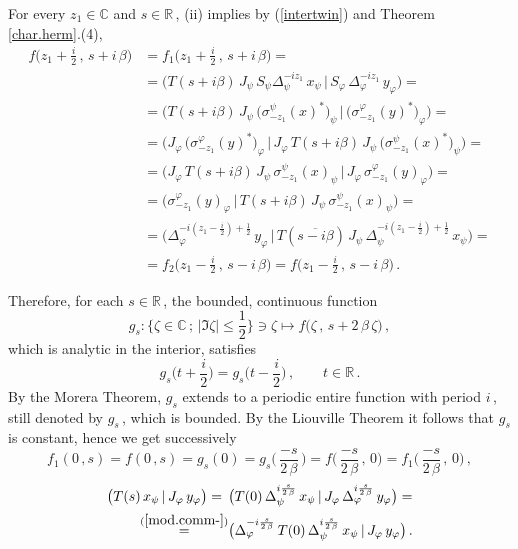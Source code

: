 \documentclass[reqno]{amsart}
\theoremstyle{definition}
\theoremstyle{remark}
\numberwithin{equation}{section}
\theoremstyle{plain}
\begin{document}
For every $z_1\in\mathbb C$ and $s\in\mathbb R\,$, (ii) implies
by (\ref{intertwin}) and Theorem \ref{char.herm}.(4),
\begin{align*}
f\Big( z_1+\frac i2\, ,\, s+i\,\beta \Big) &=f_1\Big( z_1+
\frac i2\, ,\, s+i\,\beta \Big) =\\
&=\big( T(s+i\beta )\, J_\psi\, S_\psi \Delta_\psi^{-i z_1}\,
x_\psi\, |\, S_\varphi\, \Delta_\varphi^{-i z_1}\, y_\varphi
\big) = \\
&=\big( T(s+i\beta )\, J_\psi\, \big(\sigma^\psi_{-z_1}
(x)^*\big)_\psi\, |\, \big(\sigma^\varphi_{-z_1}(y)^*
\big)_\varphi \big) =\\
&=\big( J_\varphi\, \big(\sigma^\varphi_{-z_1}(y)^*\big)_\varphi
\, |\, J_\varphi\, T(s+i\beta )\, J_\psi\, \big(
\sigma^\psi_{-z_1} (x)^*\big)_\psi \big) =\\
&=\big( J_\varphi\, T(s+i\beta )\, J_\psi\, \sigma^\psi_{-z_1}
(x)_\psi\, |\, J_\varphi\, \sigma^\varphi_{-z_1}(y)_\varphi
\big) =\\
&=\big( \sigma^\varphi_{-z_1}(y)_\varphi\, |\, T(s+i\beta )\,
J_\psi\, \sigma^\psi_{-z_1} (x)_\psi \big) =\\
&=\big( \Delta_\varphi^{-i (z_1-\frac i2 )+\frac 12}\, y_\varphi
\, |\, T(\overline{s-i \beta} )\, J_\psi\,
\Delta_\psi^{-i (z_1-\frac i2 )+\frac 12}\, x_\psi \big) =\\
&=f_2\Big( z_1-\frac i2\, ,\, s-i\,\beta \Big) =
f\Big( z_1-\frac i2\, ,\, s-i\,\beta \Big)\, .
\end{align*}

Therefore, for each $s\in\mathbb R\,$, the bounded, continuous
function
\begin{equation*}
g_s : \Big\{ \zeta\in\mathbb C\, ;\, |\Im \zeta |\leq\frac 12\Big\}
\ni\zeta\longmapsto f\big(\zeta\, ,\, s+2\,\beta\,\zeta\big)\, ,
\end{equation*}
which is analytic in the interior, satisfies
\begin{equation*}
g_s \Big( t+\frac i2\Big) =g_s \Big( t-\frac i2\Big)\, ,\qquad
t\in\mathbb R\, .
\end{equation*}
By the Morera Theorem, $g_s$ extends to a periodic entire function
with period $i\,$, still denoted by $g_s\,$, which is bounded. By
the Liouville Theorem it follows that $g_s$ is constant, hence we
get successively
\begin{equation*}
f_1(0\, ,s)=f(0\, ,s)=g_s(0)=g_s\Big(\,\frac {-s}{2\,\beta}\,\Big)
=f\Big(\,\frac {-s}{2\,\beta}\, ,\, 0\Big) =
f_1\Big(\,\frac {-s}{2\,\beta}\, ,\, 0\Big)\, ,
\end{equation*}
\begin{align*}
\big( T(s)\, x_\psi\, |\, J_\varphi\, y_\varphi\big) =\;\,& \big( T(0)
\,\Delta_\psi^{i \frac s{2\,\beta}}\, x_\psi\, |\, J_\varphi\,
\Delta_\varphi^{i \frac s{2\,\beta}}\, y_\varphi \big) =\\
\overset{(\ref{mod.comm-})}{=}&
\big( \Delta_\varphi^{-i \frac s{2\,\beta}}\, T(0)\,
\Delta_\psi^{i \frac s{2\,\beta}}\, x_\psi\, |\, J_\varphi\,
y_\varphi\big)\, .
\end{align*}
\end{document}
